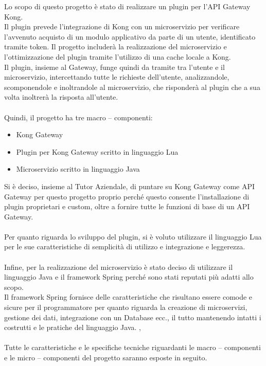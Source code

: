 Lo scopo di questo progetto è stato di realizzare un plugin per l'API Gateway Kong.\\
Il plugin prevede l'integrazione di Kong con un microservizio per verificare l'avvenuto acquisto di un modulo applicativo da parte di un utente, identificato tramite token.
Il progetto includerà la realizzazione del microservizio e l'ottimizzazione del plugin tramite l'utilizzo di una cache locale a Kong.\\
Il plugin, insieme al Gateway, funge quindi da tramite tra l'utente e il microservizio, intercettando tutte le richieste dell'utente, analizzandole, scomponendole e 
inoltrandole al microservizio, che risponderà al plugin che a sua volta inoltrerà la risposta all'utente.\\ \\
Quindi, il progetto ha tre macro – componenti:
\begin{itemize}
\item Kong Gateway
\item Plugin per Kong Gateway scritto in linguaggio Lua
\item Microservizio scritto in linguaggio Java
\end{itemize}

Si è deciso, insieme al Tutor Aziendale, di puntare su Kong Gateway come API Gateway per questo progetto proprio perché questo consente l'installazione di plugin 
proprietari e custom, oltre a fornire tutte le funzioni di base di un API Gateway. \cite{Kong}\\ \\
Per quanto riguarda lo sviluppo del plugin, si è voluto utilizzare il linguaggio Lua per le sue caratteristiche di semplicità di utilizzo e integrazione e leggerezza.\\ \\

Infine, per la realizzazione del microservizio è stato deciso di utilizzare il linguaggio Java e il framework Spring perché sono stati reputati più adatti allo scopo.\\
Il framework Spring fornisce delle caratteristiche che risultano essere comode e sicure per il programmatore per quanto riguarda la creazione di microservizi, 
gestione dei dati, integrazione con un Database ecc., il tutto mantenendo intatti i costrutti e le pratiche del linguaggio Java. \cite{Java}, \cite{SpringFramework}
\\ \\
Tutte le caratteristiche e le specifiche tecniche riguardanti le macro – componenti e le micro – componenti del progetto saranno esposte in seguito.

